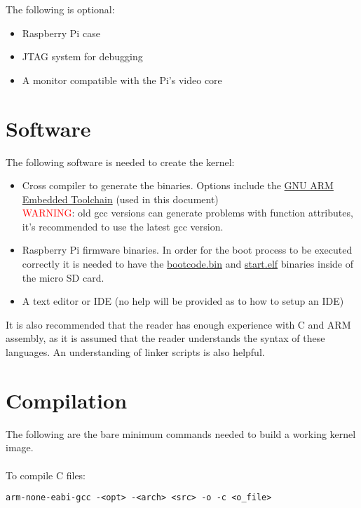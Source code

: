 \documentclass[12pt]{book}
\begin{document}
The following is optional:

\begin{itemize}
	\item Raspberry Pi case
	\item JTAG system for debugging
	\item A monitor compatible with the Pi's video core
\end{itemize}

\section{Software}
The following software is needed to create the kernel:

\begin{itemize}
	\item Cross compiler to generate the binaries. Options include the \href{https://launchpad.net/gcc-arm-embedded}{GNU ARM Embedded Toolchain} (used in this document)
	\\
	\textcolor{red}{WARNING}: old gcc versions can generate problems with function attributes, it's recommended to use the latest gcc version.
	\item Raspberry Pi firmware binaries. In order for the boot process to be executed correctly it is needed to have the \href{https://github.com/raspberrypi/firmware/blob/master/boot/bootcode.bin}{bootcode.bin} and \href{https://github.com/raspberrypi/firmware/blob/master/boot/start.elf}{start.elf} binaries inside of the micro SD card.
	\item A text editor or IDE (no help will be provided as to how to setup an IDE)
\end{itemize}

It is also recommended that the reader has enough experience with C and ARM assembly, as it is assumed that the reader understands the syntax of these languages. An understanding of linker scripts is also helpful.

\section{Compilation}
\label{sec:compilation}
The following are the bare minimum commands needed to build a working kernel image. 
\\~\\
To compile C files:

\lstset{language=GCC}
\begin{lstlisting}[style = bash, xleftmargin=0\textwidth]
	arm-none-eabi-gcc -<opt> -<arch> <src> -o -c <o_file>
\end{lstlisting}
\end{document}
